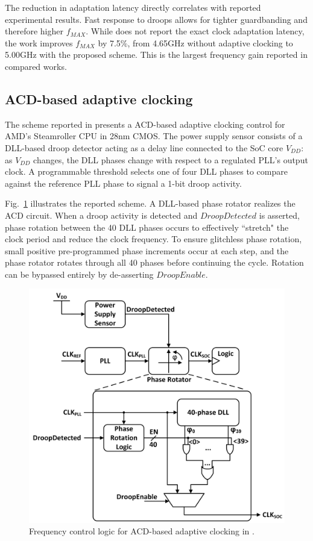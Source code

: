 \documentclass[twoside,9pt,journal,letterpage]{IEEEtran}
\begin{document}
The reduction in adaptation latency directly correlates with reported experimental results. Fast response to droops allows for tighter guardbanding and therefore higher $f_{MAX}$. While \cite{hashimoto2018} does not report the exact clock adaptation latency, the work improves $f_{MAX}$ by 7.5\%, from 4.65GHz without adaptive clocking to 5.00GHz with the proposed scheme. This is the largest frequency gain reported in compared works.

\vspace{-10pt}
\subsection{ACD-based adaptive clocking}
\label{sec:details_acd}
The scheme reported in \cite{wilcox2015} presents a ACD-based adaptive clocking control for AMD's Steamroller CPU in 28nm CMOS. The power supply sensor consists of a DLL-based droop detector acting as a delay line connected to the SoC core $V_{DD}$: as $V_{DD}$ changes, the DLL phases change with respect to a regulated PLL's output clock. A programmable threshold selects one of four DLL phases to compare against the reference PLL phase to signal a 1-bit droop activity.

Fig.\ \ref{fig:detail_acd} illustrates the reported scheme. A DLL-based phase rotator realizes the ACD circuit. When a droop activity is detected and $DroopDetected$ is asserted, phase rotation between the 40 DLL phases occurs to effectively ``stretch" the clock period and reduce the clock frequency. To ensure glitchless phase rotation, small positive pre-programmed phase increments occur at each step, and the phase rotator rotates through all 40 phases before continuing the cycle. Rotation can be bypassed entirely by de-asserting $DroopEnable$. 

\begin{figure}[h]
	\centering
	\includegraphics[width=0.7\columnwidth]{fig_detail_acd}
	\caption{Frequency control logic for ACD-based adaptive clocking in \cite{wilcox2015}.}
	\label{fig:detail_acd}
\end{figure}
\end{document}
